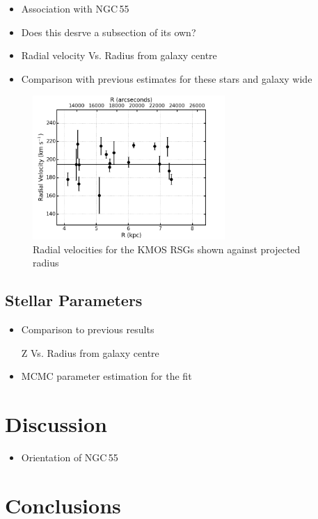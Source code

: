 \begin{itemize}
    \item Association with NGC\,55
    \item Does this desrve a subsection of its own?
    \item Radial velocity Vs. Radius from galaxy centre
    \item Comparison with previous estimates for these stars and galaxy wide
\end{itemize}

\begin{figure}
 \centering
 \includegraphics[width=0.65\textwidth]{ngc55/ngc55-RvsRV-F1}
 \caption[Radial velocities for the KMOS RSGs shown against projected radius]{
 Radial velocities for the KMOS RSGs shown against projected radius
         }

 \label{fig:ngc55}
\end{figure}
\subsection{Stellar Parameters} %
\label{sub:stellar_parameters}
\begin{itemize}
    \item Comparison to previous results
    \item [Z] Vs. Radius from galaxy centre
    \item MCMC parameter estimation for the fit
    \end{itemize}



\section{Discussion} %
\label{sec:discussion}

\begin{itemize}
    \item Orientation of NGC\,55
\end{itemize}

\section{Conclusions} %
\label{sec:conclusions}


